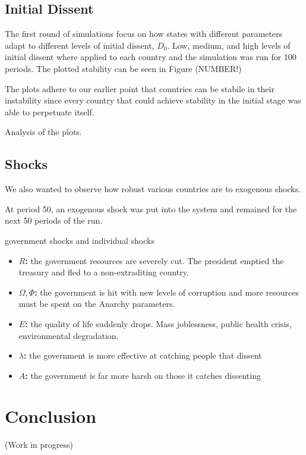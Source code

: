 \documentclass[12pt]{article}
\begin{document}
\begin{spacing}{1.5}
\subsection{Initial Dissent}

The first round of simulations focus on how states with different parameters adapt to different levels of initial dissent, $D_0$. Low, medium, and high levels of initial dissent where applied to each country and the simulation was run for 100 periods. The plotted stability can be seen in Figure (NUMBER!)


The plots adhere to our earlier point that countries can be stabile in their instability since every country that could achieve stability in the initial stage was able to perpetuate itself. 


Analysis of the plots. 

\subsection{Shocks}

We also wanted to observe how robust various countries are to exogenous shocks. 

At period 50, an exogenous shock was put into the system and remained for the next 50 periods of the run. 

government shocks and individual shocks 

\begin{itemize}
	\item \textbf{$R$:} the government resources are severely cut. The president emptied the treasury and fled to a non-extraditing country. 
	\item \textbf{$\Omega,\Phi$:} the government is hit with new levels of corruption and more resources must be spent on the Anarchy parameters. 
	\item \textbf{$E$:} the quality of life suddenly drops. Mass joblessness, public health crisis, environmental degradation. 
	\item \textbf{$\lambda$:} the government is more effective at catching people that dissent 
	\item \textbf{$A$:} the government is far more harsh on those it catches dissenting 
\end{itemize}







\section{Conclusion}


(Work in progress)




\end{spacing}


\pagebreak




\nocite{*}
\end{document}
